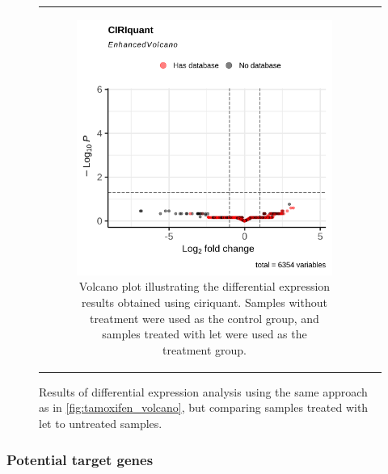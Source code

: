 \begin{figure}[H]
\begin{tabular}{cc}
\begin{subfigure}{0.5\textwidth}
            \includegraphics[width=\linewidth]{chapters/4_results_and_discussion/figures/dea/ciriquant/letrozole/volcano.png}
            \caption{Volcano plot illustrating the differential expression
                results obtained using \gls{ciriquant}.
                Samples without treatment were used as the control group, and samples treated
                with \gls{let} were used as the treatment group.
            }
            \label{fig:letrozole_volcano_ciriquant}
        \end{subfigure} &

    \end{tabular}
    \caption{Results of differential expression analysis using the same
        approach as in
        \cref{fig:tamoxifen_volcano}, but comparing samples treated with
        \gls{let}
        to untreated samples.
    }
    \label{fig:letrozole_volcano}
\end{figure}

\subsubsection{Potential target genes}
